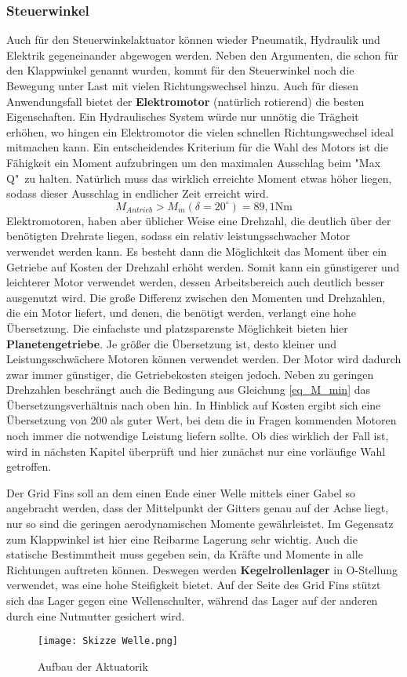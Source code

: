 \subsubsection{Steuerwinkel}
Auch für den Steuerwinkelaktuator können wieder Pneumatik, Hydraulik und Elektrik gegeneinander abgewogen werden. Neben den Argumenten, die schon für den Klappwinkel genannt wurden, kommt für den Steuerwinkel noch die Bewegung unter Last mit vielen Richtungswechsel hinzu. Auch für diesen Anwendungsfall bietet der \textbf{Elektromotor} (natürlich rotierend) die besten Eigenschaften. Ein Hydraulisches System würde nur unnötig die Trägheit erhöhen, wo hingen ein Elektromotor die vielen schnellen Richtungswechsel ideal mitmachen kann.
Ein entscheidendes Kriterium für die Wahl des Motors ist die Fähigkeit ein Moment aufzubringen um den maximalen Ausschlag beim "Max Q"\ zu halten. Natürlich muss das wirklich erreichte Moment etwas höher liegen, sodass dieser Ausschlag in endlicher Zeit erreicht wird.
\begin{equation}\label{eq_M_min}
	M_{Antrieb} > M_m(\delta = 20^\circ) = 89,1\mathrm{Nm}
\end{equation}
Elektromotoren, haben aber üblicher Weise eine Drehzahl, die deutlich über der benötigten Drehrate liegen, sodass ein relativ leistungsschwacher Motor verwendet werden kann. Es besteht dann die Möglichkeit das Moment über ein Getriebe auf Kosten der Drehzahl erhöht werden. Somit kann ein günstigerer und leichterer Motor verwendet werden, dessen Arbeitsbereich auch deutlich besser ausgenutzt wird. Die große Differenz zwischen den Momenten und Drehzahlen, die ein Motor liefert, und denen, die benötigt werden, verlangt eine hohe Übersetzung. Die einfachste und platzsparenste Möglichkeit bieten hier \textbf{Planetengetriebe}. Je größer die Übersetzung ist, desto kleiner und Leistungsschwächere Motoren können verwendet werden. Der Motor wird dadurch zwar immer günstiger, die Getriebekosten steigen jedoch. Neben zu geringen Drehzahlen beschrängt auch die Bedingung aus Gleichung \ref{eq_M_min} das Übersetzungsverhältnis nach oben hin. In Hinblick auf Kosten ergibt sich eine Übersetzung von 200 als guter Wert, bei dem die in Fragen kommenden Motoren noch immer die notwendige Leistung liefern sollte. Ob dies wirklich der Fall ist, wird in nächsten Kapitel überprüft und hier zunächst nur eine vorläufige Wahl getroffen.

Der Grid Fins soll an dem einen Ende einer Welle mittels einer Gabel so angebracht werden, dass der Mittelpunkt der Gitters genau auf der Achse liegt, nur so sind die geringen aerodynamischen Momente gewährleistet. Im Gegensatz zum Klappwinkel ist hier eine Reibarme Lagerung sehr wichtig. Auch die statische Bestimmtheit muss gegeben sein, da Kräfte und Momente in alle Richtungen auftreten können. Deswegen werden \textbf{Kegelrollenlager} in O-Stellung verwendet, was eine hohe Steifigkeit bietet. Auf der Seite des Grid Fins stützt sich das Lager gegen eine Wellenschulter, während das Lager auf der anderen durch eine Nutmutter gesichert wird.
\begin{figure}[h]
	\centering
	\texttt{[image: Skizze Welle.png]}
	\caption{Aufbau der Aktuatorik}
\end{figure}\\
